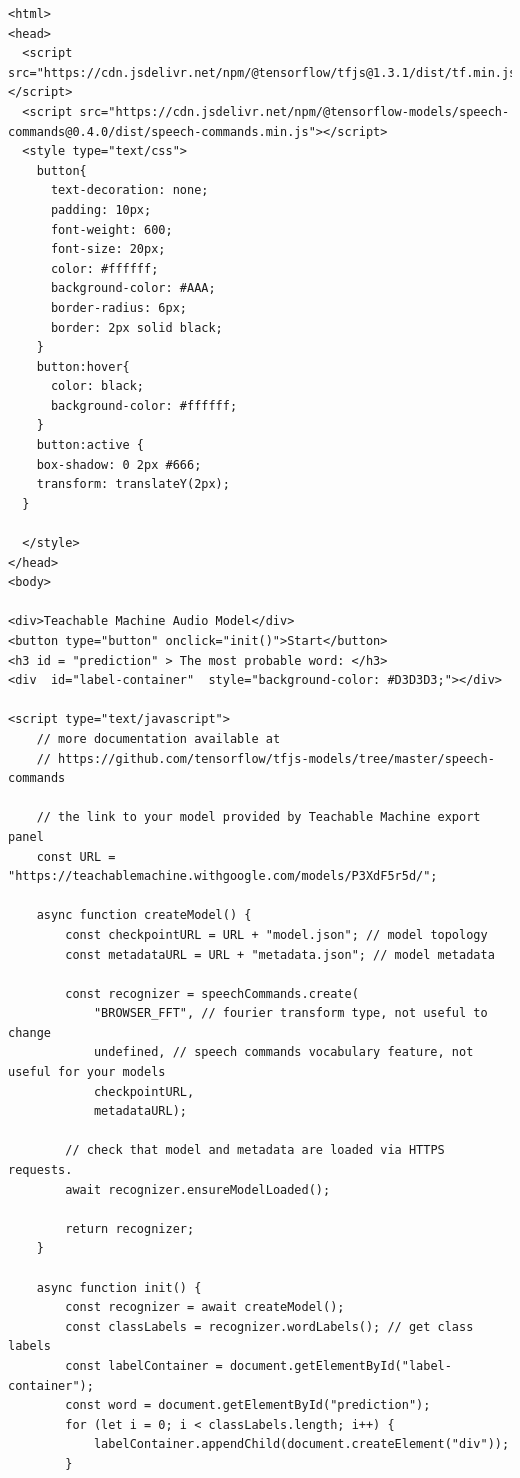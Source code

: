 \begin{lstlisting}
<html>
<head>
  <script src="https://cdn.jsdelivr.net/npm/@tensorflow/tfjs@1.3.1/dist/tf.min.js"></script>
  <script src="https://cdn.jsdelivr.net/npm/@tensorflow-models/speech-commands@0.4.0/dist/speech-commands.min.js"></script>
  <style type="text/css">
    button{
      text-decoration: none;
      padding: 10px;
      font-weight: 600;
      font-size: 20px;
      color: #ffffff;
      background-color: #AAA;
      border-radius: 6px;
      border: 2px solid black;
    }
    button:hover{
      color: black;
      background-color: #ffffff;
    }
    button:active {
    box-shadow: 0 2px #666;
    transform: translateY(2px);
  }

  </style>
</head>
<body>

<div>Teachable Machine Audio Model</div>
<button type="button" onclick="init()">Start</button>
<h3 id = "prediction" > The most probable word: </h3>
<div  id="label-container"  style="background-color: #D3D3D3;"></div>

<script type="text/javascript">
    // more documentation available at
    // https://github.com/tensorflow/tfjs-models/tree/master/speech-commands

    // the link to your model provided by Teachable Machine export panel
    const URL = "https://teachablemachine.withgoogle.com/models/P3XdF5r5d/";

    async function createModel() {
        const checkpointURL = URL + "model.json"; // model topology
        const metadataURL = URL + "metadata.json"; // model metadata

        const recognizer = speechCommands.create(
            "BROWSER_FFT", // fourier transform type, not useful to change
            undefined, // speech commands vocabulary feature, not useful for your models
            checkpointURL,
            metadataURL);

        // check that model and metadata are loaded via HTTPS requests.
        await recognizer.ensureModelLoaded();

        return recognizer;
    }

    async function init() {
        const recognizer = await createModel();
        const classLabels = recognizer.wordLabels(); // get class labels
        const labelContainer = document.getElementById("label-container");
        const word = document.getElementById("prediction");
        for (let i = 0; i < classLabels.length; i++) {
            labelContainer.appendChild(document.createElement("div"));
        }


\end{lstlisting}
